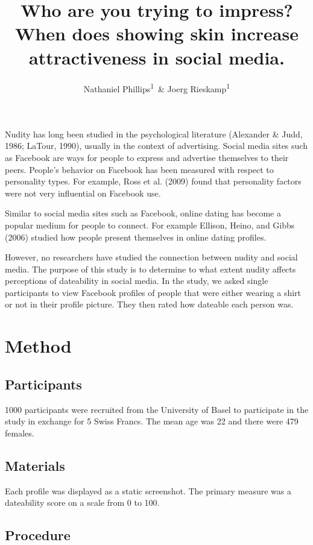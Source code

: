 \documentclass[english,floatsintext,man]{apa6}
\title{Who are you trying to impress? When does showing skin increase
attractiveness in social media.}
\author{Nathaniel Phillips\textsuperscript{1}~\& Joerg Rieskamp\textsuperscript{1}}
\affiliation{
    \vspace{0.5cm}
          \textsuperscript{1} University of Basel  }
\theoremstyle{definition}
\theoremstyle{definition}
\theoremstyle{remark}
\begin{document}
\maketitle

\setcounter{secnumdepth}{0}



Nudity has long been studied in the psychological literature (Alexander
\& Judd, 1986; LaTour, 1990), usually in the context of advertising.
Social media sites such as Facebook are ways for people to express and
advertise themselves to their peers. People's behavior on Facebook has
been measured with respect to personality types. For example, Ross et
al. (2009) found that personality factors were not very influential on
Facebook use.

Similar to social media sites such as Facebook, online dating has become
a popular medium for people to connect. For example Ellison, Heino, and
Gibbs (2006) studied how people present themselves in online dating
profiles.

However, no researchers have studied the connection between nudity and
social media. The purpose of this study is to determine to what extent
nudity affects perceptions of dateability in social media. In the study,
we asked single participants to view Facebook profiles of people that
were either wearing a shirt or not in their profile picture. They then
rated how dateable each person was.

\section{Method}\label{method}

\subsection{Participants}\label{participants}

1000 participants were recruited from the University of Basel to
participate in the study in exchange for 5 Swiss Francs. The mean age
was 22 and there were 479 females.

\subsection{Materials}\label{materials}

Each profile was displayed as a static screenshot. The primary measure
was a dateability score on a scale from 0 to 100.

\subsection{Procedure}\label{procedure}
\end{document}
